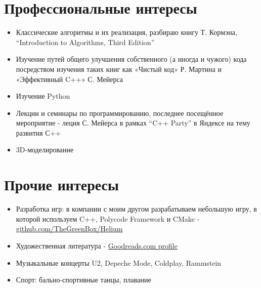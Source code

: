 \documentclass[a4paper, 11pt]{article}
\begin{document}
\section{Профессиональные интересы}
\begin{itemize}
    \item   Классические алгоритмы и их реализация, разбираю книгу Т. Кормэна,
            ``Introduction to Algorithms, Third Edition''
    \item   Изучение путей общего улучшения собственного (а иногда и чужого)
            кода посредством изучения таких книг как «Чистый код» Р. Мартина и
            «Эффективный C++» С. Мейерса
    \item   Изучение Python
    \item   Лекции и семинары по программированию, последнее посещённое мероприятие
            - леция С. Мейерса в рамках ``C++ Party'' в Яндексе на тему развития
            С++
    \item   3D-моделирование
\end{itemize}

\section{Прочие интересы}
\begin{itemize}
    \item   Разработка игр: в компании с моим другом разрабатываем
            небольшую игру, в которой используем C++, Polycode Framework и CMake -
            \href{https://github.com/thegreenbox/helium}{github.com/TheGreenBox/Helium}
    \item   Художественная литература -
            \href{https://www.goodreads.com/user/show/29629010-sergey-nikitin}{Goodreads.com profile}
    \item   Музыкальные концерты U2, Depeche Mode, Coldplay, Rammstein
    \item   Спорт: бально-спортивные танцы, плавание
\end{itemize}
\end{document}
